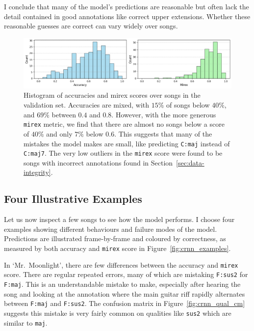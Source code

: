 I conclude that many of the model's predictions are reasonable but often lack the detail contained in good annotations like correct upper extensions. Whether these reasonable guesses are correct can vary widely over songs.

\begin{figure}[ht]
    \centering
    \includegraphics[width=1.0\textwidth]{figures/accuracy_mirex_histograms.png}
    \caption{Histogram of accuracies and mirex scores over songs in the validation set. Accuracies are mixed, with $15\%$ of songs below $40\%$, and $69\%$ between $0.4$ and $0.8$. However, with the more generous \texttt{mirex} metric, we find that there are almost no songs below a score of $40\%$ and only $7\%$ below $0.6$. This suggests that many of the mistakes the model makes are small, like predicting \texttt{C:maj} instead of \texttt{C:maj7}. The very low outliers in the \texttt{mirex} score were found to be songs with incorrect annotations found in Section~\ref{sec:data-integrity}.}\label{fig:crnn_song_hist}
\end{figure}

\subsection{Four Illustrative Examples}\label{sec:crnn_examples}

Let us now inspect a few songs to see how the model performs. I choose four examples showing different behaviours and failure modes of the model. Predictions are illustrated frame-by-frame and coloured by correctness, as measured by both accuracy and \texttt{mirex} score in Figure~\ref{fig:crnn_examples}. 

In `Mr.\ Moonlight', there are few differences between the accuracy and \texttt{mirex} score. There are regular repeated errors, many of which are mistaking \texttt{F:sus2} for \texttt{F:maj}. This is an understandable mistake to make, especially after hearing the song and looking at the annotation where the main guitar riff rapidly alternates between \texttt{F:maj} and \texttt{F:sus2}. The confusion matrix in Figure~\ref{fig:crnn_qual_cm} suggests this mistake is very fairly common on qualities like \texttt{sus2} which are similar to \texttt{maj}. 

